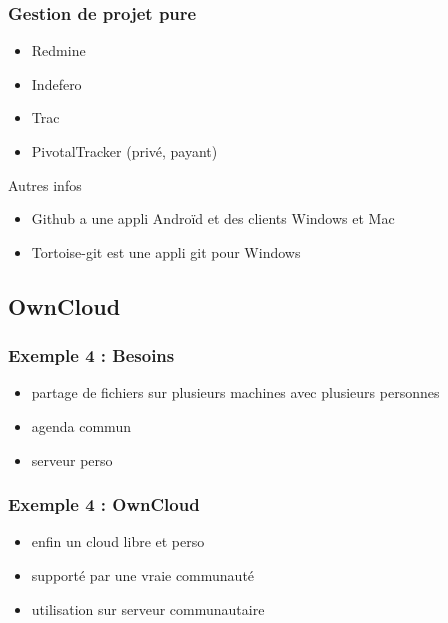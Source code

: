 \documentclass{beamer}
\begin{document}
\begin{frame}
    \frametitle{Gestion de projet pure}

    \begin{itemize}
        \item Redmine
        \item Indefero
        \item Trac
        \item PivotalTracker (privé, payant)
    \end{itemize}

    \pause

    \begin{block}{Autres infos}
        \begin{itemize}
            \item Github a une appli Androïd et des clients Windows et Mac
            \item Tortoise-git est une appli git pour Windows
        \end{itemize}
    \end{block}
\end{frame}

\subsection{OwnCloud} %

\begin{frame}
    \frametitle{Exemple 4 : Besoins}

    \begin{itemize}
        \item partage de fichiers sur plusieurs machines avec plusieurs personnes
        \item agenda commun
        \item serveur perso
    \end{itemize}
\end{frame}

\begin{frame}
    \frametitle{Exemple 4 : OwnCloud}

    \begin{itemize}
        \item enfin un cloud libre et perso
        \item supporté par une vraie communauté
        \item utilisation sur serveur communautaire
    \end{itemize}
\end{frame}
\end{document}
